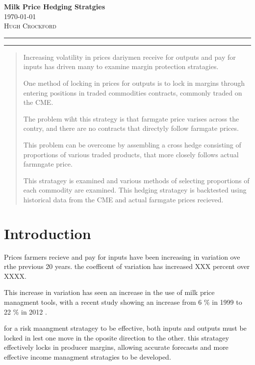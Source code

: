 \documentclass[11pt]{article}
\begin{document}
\begin{flushleft}
	\vspace*{0.3in}
	\Huge \textbf{Milk Price Hedging Stratgies}\\
	\Large \today \\
	\vspace{0.25in}
	\textsc{Hugh Crockford}
	\vspace{0.25in}
	\hrule
	\hrule
	\tableofcontents
\end{flushleft}

	\vspace{0.75in}
	\begin{abstract}
		Increasing volatility in prices dariymen receive for outputs and pay for inputs has driven many to examine margin protection stratagies.

		One method of locking in prices for outputs is to lock in margins through entering positions in traded commodities contracts, commonly traded on the CME.

		The problem wiht this strategy is that farmgate price varises across the contry, and there are no contracts that directyly follow farmgate prices.

		This problem can be overcome by assembling a cross hedge consisting of proportions of various traded products, that more closely follows actual farmngate price.

		This stratagey is examined and various methods of selecting proportions of each commodity are examined. This hedging stratagey is backtested using historical data from the CME and actual farmgate prices recieved.
	\end{abstract}

\newpage

\section{Introduction}
	Prices farmers recieve and pay for inputs have been increasing in variation ove rthe previous 20 years. \cite{Wolf2012}
	the coefficent of variation has increased XXX percent over XXXX. 

	This increase in variation has seen an increase in the use of milk price managment tools, with a recent study showing an increase from 6 \% in 1999 to 22 \% in 2012 \cite{Wolf2012}.

	for a risk maangment stratagey to be effective, both inputs and outputs must be locked in lest one move in the oposite direction to the other. 
	this stratagey effectively locks in producer margins, allowing accurate forecasts and more effective income managment stratagies to be developed.
\end{document}
